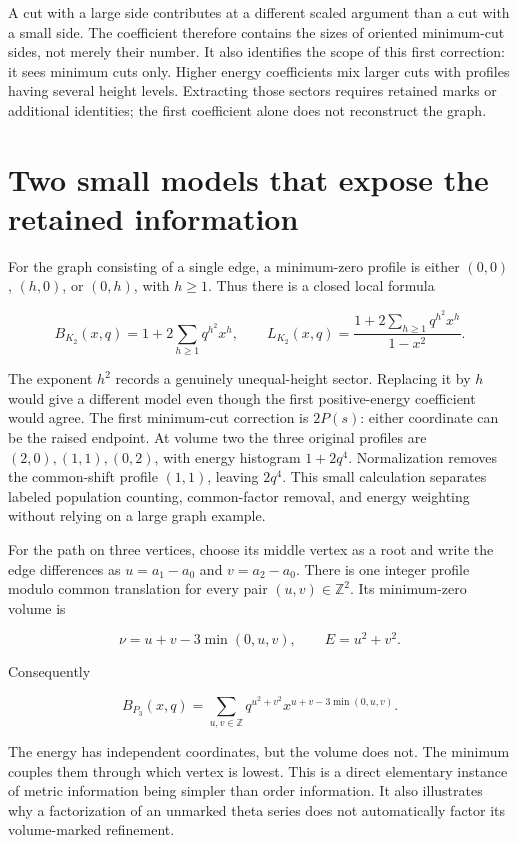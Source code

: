 \documentclass[
  11pt,
  a4paper,
]{report}
\begin{document}
A cut with a large side contributes at a different scaled argument than
a cut with a small side. The coefficient therefore contains the sizes of
oriented minimum-cut sides, not merely their number. It also identifies
the scope of this first correction: it sees minimum cuts only. Higher
energy coefficients mix larger cuts with profiles having several height
levels. Extracting those sectors requires retained marks or additional
identities; the first coefficient alone does not reconstruct the graph.

\hypertarget{two-small-models-that-expose-the-retained-information}{%
\section{Two small models that expose the retained
information}\label{two-small-models-that-expose-the-retained-information}}

For the graph consisting of a single edge, a minimum-zero profile is
either \((0,0)\), \((h,0)\), or \((0,h)\), with \(h\ge1\). Thus there is
a closed local formula

\[
 B_{K_2}(x,q)=1+2\sum_{h\ge1}q^{h^2}x^h,
 \qquad
 L_{K_2}(x,q)=\frac{1+2\sum_{h\ge1}q^{h^2}x^h}{1-x^2}.
 \tag{5.1}
\]

The exponent \(h^2\) records a genuinely unequal-height sector.
Replacing it by \(h\) would give a different model even though the first
positive-energy coefficient would agree. The first minimum-cut
correction is \(2P(s)\): either coordinate can be the raised endpoint.
At volume two the three original profiles are \((2,0),(1,1),(0,2)\),
with energy histogram \(1+2q^4\). Normalization removes the common-shift
profile \((1,1)\), leaving \(2q^4\). This small calculation separates
labeled population counting, common-factor removal, and energy weighting
without relying on a large graph example.

For the path on three vertices, choose its middle vertex as a root and
write the edge differences as \(u=a_1-a_0\) and \(v=a_2-a_0\). There is
one integer profile modulo common translation for every pair
\((u,v)\in\mathbb Z^2\). Its minimum-zero volume is

\[
 \nu=u+v-3\min(0,u,v),
 \qquad E=u^2+v^2.
\]

Consequently

\[
 B_{P_3}(x,q)=\sum_{u,v\in\mathbb Z}
 q^{u^2+v^2}x^{u+v-3\min(0,u,v)}.
 \tag{5.2}
\]

The energy has independent coordinates, but the volume does not. The
minimum couples them through which vertex is lowest. This is a direct
elementary instance of metric information being simpler than order
information. It also illustrates why a factorization of an unmarked
theta series does not automatically factor its volume-marked refinement.
\end{document}

